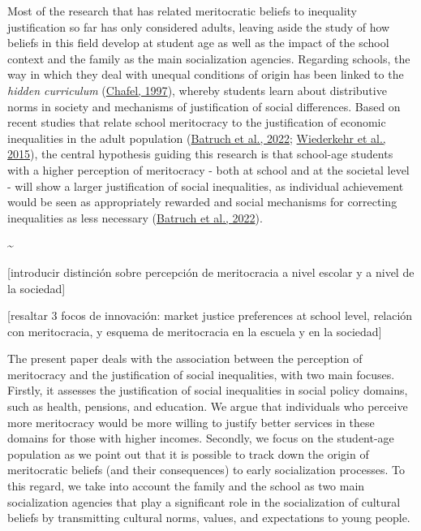 \documentclass[
  letterpaper,
  DIV=11,
  numbers=noendperiod]{scrartcl}
\begin{document}
Most of the research that has related meritocratic beliefs to inequality
justification so far has only considered adults, leaving aside the study
of how beliefs in this field develop at student age as well as the
impact of the school context and the family as the main socialization
agencies. Regarding schools, the way in which they deal with unequal
conditions of origin has been linked to the \emph{hidden curriculum}
(\protect\hyperlink{ref-chafel_schooling_1997}{Chafel, 1997}), whereby
students learn about distributive norms in society and mechanisms of
justification of social differences. Based on recent studies that relate
school meritocracy to the justification of economic inequalities in the
adult population (\protect\hyperlink{ref-batruch_belief_2022}{Batruch et
al., 2022}; \protect\hyperlink{ref-wiederkehr_belief_2015}{Wiederkehr et
al., 2015}), the central hypothesis guiding this research is that
school-age students with a higher perception of meritocracy - both at
school and at the societal level - will show a larger justification of
social inequalities, as individual achievement would be seen as
appropriately rewarded and social mechanisms for correcting inequalities
as less necessary (\protect\hyperlink{ref-batruch_belief_2022}{Batruch
et al., 2022}).

\textasciitilde{}

{[}introducir distinción sobre percepción de meritocracia a nivel
escolar y a nivel de la sociedad{]}

{[}resaltar 3 focos de innovación: market justice preferences at school
level, relación con meritocracia, y esquema de meritocracia en la
escuela y en la sociedad{]}

The present paper deals with the association between the perception of
meritocracy and the justification of social inequalities, with two main
focuses. Firstly, it assesses the justification of social inequalities
in social policy domains, such as health, pensions, and education. We
argue that individuals who perceive more meritocracy would be more
willing to justify better services in these domains for those with
higher incomes. Secondly, we focus on the student-age population as we
point out that it is possible to track down the origin of meritocratic
beliefs (and their consequences) to early socialization processes. To
this regard, we take into account the family and the school as two main
socialization agencies that play a significant role in the socialization
of cultural beliefs by transmitting cultural norms, values, and
expectations to young people.
\end{document}
